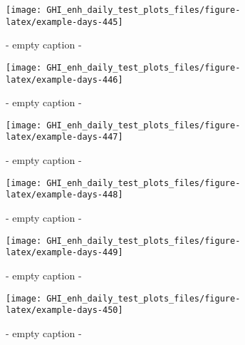 \documentclass[
  10pt,
  a4paper,oneside]{article}
\begin{document}
\begin{figure}[H]

{\centering \texttt{[image: GHI\_enh\_daily\_test\_plots\_files/figure-latex/example-days-445]} 

}

\caption{ - empty caption - }\label{fig:example-days-445}
\end{figure}

\begin{figure}[H]

{\centering \texttt{[image: GHI\_enh\_daily\_test\_plots\_files/figure-latex/example-days-446]} 

}

\caption{ - empty caption - }\label{fig:example-days-446}
\end{figure}

\begin{figure}[H]

{\centering \texttt{[image: GHI\_enh\_daily\_test\_plots\_files/figure-latex/example-days-447]} 

}

\caption{ - empty caption - }\label{fig:example-days-447}
\end{figure}

\begin{figure}[H]

{\centering \texttt{[image: GHI\_enh\_daily\_test\_plots\_files/figure-latex/example-days-448]} 

}

\caption{ - empty caption - }\label{fig:example-days-448}
\end{figure}

\begin{figure}[H]

{\centering \texttt{[image: GHI\_enh\_daily\_test\_plots\_files/figure-latex/example-days-449]} 

}

\caption{ - empty caption - }\label{fig:example-days-449}
\end{figure}

\begin{figure}[H]

{\centering \texttt{[image: GHI\_enh\_daily\_test\_plots\_files/figure-latex/example-days-450]} 

}

\caption{ - empty caption - }\label{fig:example-days-450}
\end{figure}
\end{document}
